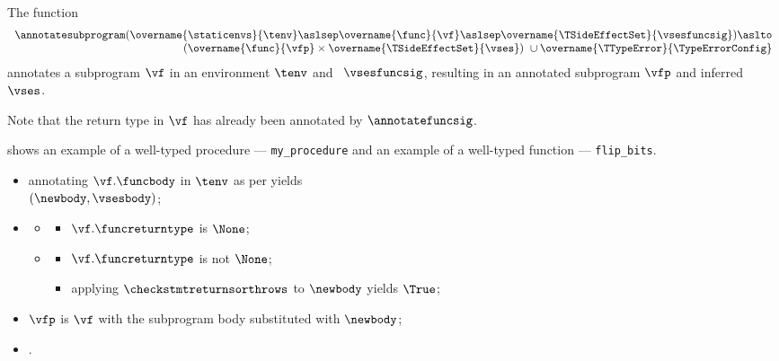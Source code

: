 \hypertarget{def-annotatesubprogram}{}
The function
\[
\begin{array}{r}
  \annotatesubprogram(\overname{\staticenvs}{\tenv} \aslsep \overname{\func}{\vf} \aslsep \overname{\TSideEffectSet}{\vsesfuncsig})
  \aslto \\
  (\overname{\func}{\vfp} \times \overname{\TSideEffectSet}{\vses})\ \cup \overname{\TTypeError}{\TypeErrorConfig}
\end{array}
\]
annotates a subprogram $\vf$ in an environment $\tenv$ and \sideeffectsetterm\ $\vsesfuncsig$, resulting in an annotated subprogram $\vfp$
and inferred \sideeffectsetterm\ $\vses$.
\ProseOtherwiseTypeError

Note that the return type in $\vf$ has already been annotated by $\annotatefuncsig$.

 shows an example of a well-typed procedure --- \verb|my_procedure|
and an example of a well-typed function --- \verb|flip_bits|.

\ProseParagraph
\AllApply
\begin{itemize}
  \item annotating $\vf.\funcbody$ in $\tenv$ as per  yields \\
        $(\newbody, \vsesbody)$\ProseOrTypeError;
  \item \OneApplies
  \begin{itemize}
    \item {}
    \begin{itemize}
      \item $\vf.\funcreturntype$ is $\None$;
    \end{itemize}

    \item {}
    \begin{itemize}
      \item $\vf.\funcreturntype$ is not $\None$;
      \item applying $\checkstmtreturnsorthrows$ to $\newbody$ yields $\True$\ProseOrTypeError;
    \end{itemize}
  \end{itemize}
  \item $\vfp$ is $\vf$ with the subprogram body substituted with $\newbody$;
  \item {}.
\end{itemize}

